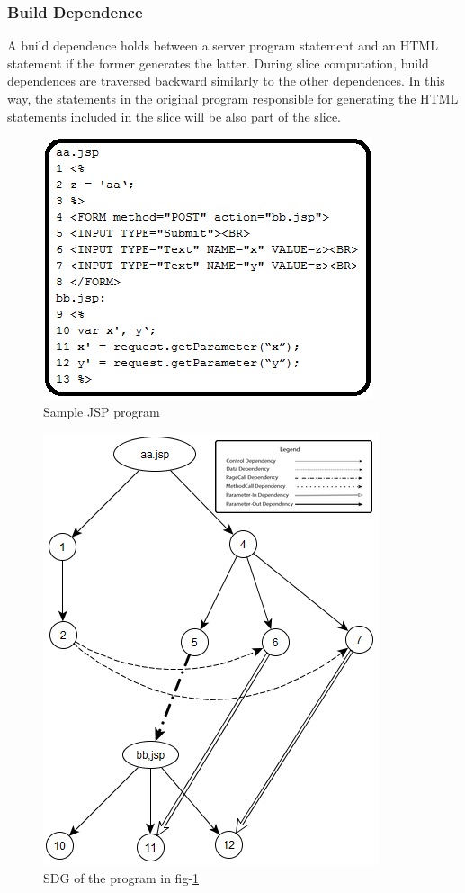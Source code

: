 \documentclass[11pt]{article}   %
\begin{document}
\subsubsection{Build Dependence}
A build dependence holds between a server program statement and an HTML statement if the former generates the latter.
During slice computation, build dependences are traversed backward similarly to the other dependences. In this way, the statements in the original program responsible for generating the HTML statements included in the slice will be also part of the slice.\cite{tonella2005web}
\begin{figure}
\begin{center}
\includegraphics[scale=1.3]{example.png}
\end{center}
\caption{Sample JSP program }
\label{fig1}
\end{figure}
\begin{figure}

\begin{center}
\includegraphics[scale=0.8]{SDG_example_l.png}
\end{center}
\caption{SDG of the program in fig-\ref{fig1} }
\label{fig2}
\end{figure}
\end{document}

